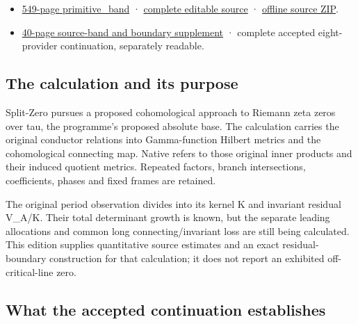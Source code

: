 \documentclass[
]{article}
\providecommand{\tightlist}{%
  \setlength{\itemsep}{0pt}\setlength{\parskip}{0pt}}
\begin{document}
\begin{itemize}
\tightlist
\item
  \href{https://zenodo.org/api/records/22773401/files/74-primitive-band-reader.pdf/content}{549-page
  primitive\_band} ·
  \href{https://github.com/KokunoYumeto/zeta-function-research-reader/tree/02e47c28b98912d3ea1ec1bf01a3a5ba44197e9f/workbenches/splitzero-tandem/continuations/20260915-primitive-band-continuation}{complete
  editable source} ·
  \href{https://zenodo.org/api/records/22773401/files/76-primitive-band-sources.zip/content}{offline
  source ZIP}.
\item
  \href{https://zenodo.org/api/records/22773401/files/75-primitive-band-supplement.pdf/content}{40-page
  source-band and boundary supplement} · complete accepted
  eight-provider continuation, separately readable.
\end{itemize}

\subsection{The calculation and its
purpose}\label{the-calculation-and-its-purpose}

Split-Zero pursues a proposed cohomological approach to Riemann zeta
zeros over tau, the programme's proposed absolute base. The calculation
carries the original conductor relations into Gamma-function Hilbert
metrics and the cohomological connecting map. Native refers to those
original inner products and their induced quotient metrics. Repeated
factors, branch intersections, coefficients, phases and fixed frames are
retained.

The original period observation divides into its kernel K and invariant
residual V\_A/K. Their total determinant growth is known, but the
separate leading allocations and common long connecting/invariant loss
are still being calculated. This edition supplies quantitative source
estimates and an exact residual-boundary construction for that
calculation; it does not report an exhibited off-critical-line zero.

\subsection{What the accepted continuation
establishes}\label{what-the-accepted-continuation-establishes}
\end{document}
